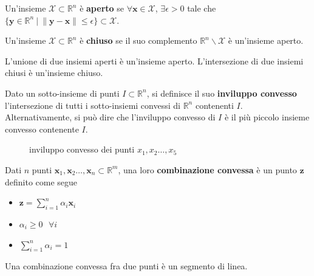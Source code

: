 \documentclass[10pt, letterpaper]{report}
\begin{document}
\begin{definizione}
    Un'insieme $\mathcal X\subset \mathbb R^n$ è \textbf{aperto} se $\forall \mathbf x\in \mathcal X$, $\exists \epsilon >0$ tale che $\{\mathbf y\in \mathbb R^n \ | \ \|\mathbf y-\mathbf x\|\le \epsilon   \}\subset \mathcal X$.
\end{definizione}
\begin{definizione}
    Un'insieme $\mathcal X\subset \mathbb R^n$ è \textbf{chiuso} se il suo complemento $\mathbb R^n \backslash \mathcal X$ è un'insieme aperto.
\end{definizione}
\begin{osservazione}
    L'unione di due insiemi aperti è un'insieme aperto. L'intersezione di due insiemi chiusi è un'insieme chiuso.
\end{osservazione}
\begin{definizione}
    Dato un sotto-insieme di punti  $I\subset \mathbb R^n$, si definisce il suo \textbf{inviluppo convesso} l'intersezione di tutti i sotto-insiemi convessi di $\mathbb R^n$ contenenti $I$. Alternativamente, si può dire che l'inviluppo convesso di $I$ è il più piccolo insieme convesso contenente $I$.
\end{definizione}
\begin{figure}[h]
    \caption{inviluppo convesso dei punti $x_1,x_2\dots,x_5$}
\end{figure}
\begin{definizione}
    Dati $n$ punti $\mathbf{x}_1,\mathbf{x}_2\dots ,\mathbf{x}_n\subset \mathbb R^m$, una loro \textbf{combinazione convessa} è un punto $\mathbf{z}$ definito come segue \begin{itemize}
        \item $\displaystyle\mathbf z =  \sum_{i=1}^n\alpha_i\mathbf x_i$
        \item $\alpha_i\ge 0  \ \ \ \forall i$
        \item $\displaystyle  \sum_{i=1}^n\alpha_i=1$
    \end{itemize}
\end{definizione}
\begin{osservazione}
    Una combinazione convessa fra due punti è un segmento di linea.
\end{osservazione}
\end{document}
